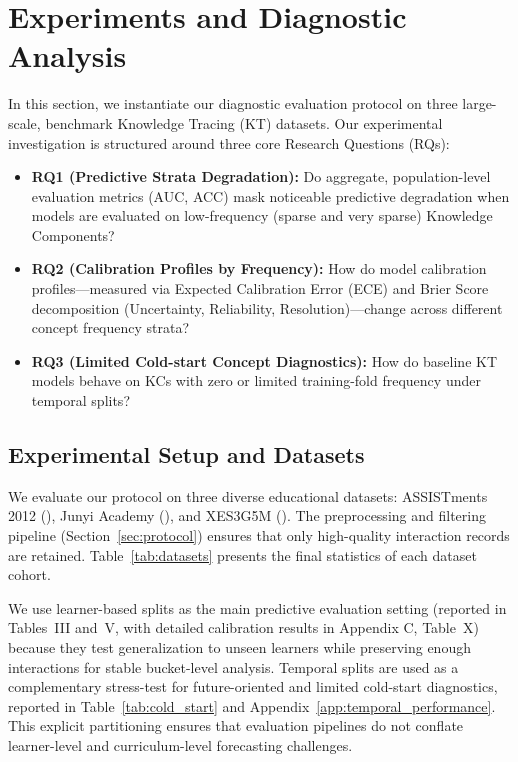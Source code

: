 \section{Experiments and Diagnostic Analysis}
\label{sec:experiments}

In this section, we instantiate our diagnostic evaluation protocol on three large-scale, benchmark Knowledge Tracing (KT) datasets. Our experimental investigation is structured around three core Research Questions (RQs):
\begin{itemize}
    \item \textbf{RQ1 (Predictive Strata Degradation):} Do aggregate, population-level evaluation metrics (AUC, ACC) mask noticeable predictive degradation when models are evaluated on low-frequency (sparse and very sparse) Knowledge Components?
    \item \textbf{RQ2 (Calibration Profiles by Frequency):} How do model calibration profiles—measured via Expected Calibration Error (ECE) and Brier Score decomposition (Uncertainty, Reliability, Resolution)—change across different concept frequency strata?
    \item \textbf{RQ3 (Limited Cold-start Concept Diagnostics):} How do baseline KT models behave on KCs with zero or limited training-fold frequency under temporal splits?
\end{itemize}

\subsection{Experimental Setup and Datasets}
We evaluate our protocol on three diverse educational datasets: ASSISTments 2012 (), Junyi Academy (), and XES3G5M (). The preprocessing and filtering pipeline (Section~\ref{sec:protocol}) ensures that only high-quality interaction records are retained. Table~\ref{tab:datasets} presents the final statistics of each dataset cohort.

We use learner-based splits as the main predictive evaluation setting (reported in Tables~III and~V, with detailed calibration results in Appendix C, Table~X) because they test generalization to unseen learners while preserving enough interactions for stable bucket-level analysis. Temporal splits are used as a complementary stress-test for future-oriented and limited cold-start diagnostics, reported in Table~\ref{tab:cold_start} and Appendix~\ref{app:temporal_performance}. This explicit partitioning ensures that evaluation pipelines do not conflate learner-level and curriculum-level forecasting challenges.

